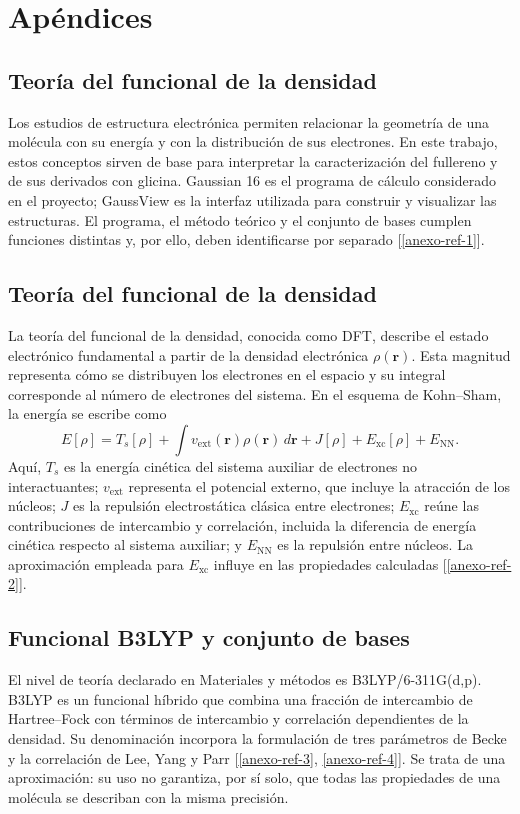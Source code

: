 
\chapter{Apéndices}
\label{ap:fundamentos-gaussian}
\section{Teoría del funcional de la densidad}
Los estudios de estructura electrónica permiten relacionar la geometría de una molécula con su energía y con la distribución de sus electrones. En este trabajo, estos conceptos sirven de base para interpretar la caracterización del fullereno y de sus derivados con glicina. Gaussian 16 es el programa de cálculo considerado en el proyecto; GaussView es la interfaz utilizada para construir y visualizar las estructuras. El programa, el método teórico y el conjunto de bases cumplen funciones distintas y, por ello, deben identificarse por separado [\ref{anexo-ref-1}].

\section{Teoría del funcional de la densidad}
La teoría del funcional de la densidad, conocida como DFT, describe el estado electrónico fundamental a partir de la densidad electrónica $\rho(\mathbf r)$. Esta magnitud representa cómo se distribuyen los electrones en el espacio y su integral corresponde al número de electrones del sistema. En el esquema de Kohn--Sham, la energía se escribe como
\begin{equation}
 E[\rho]=T_s[\rho]+\int v_{\mathrm{ext}}(\mathbf r)\rho(\mathbf r)\,d\mathbf r
 +J[\rho]+E_{\mathrm{xc}}[\rho]+E_{\mathrm{NN}}.
\end{equation}
Aquí, $T_s$ es la energía cinética del sistema auxiliar de electrones no interactuantes; $v_{\mathrm{ext}}$ representa el potencial externo, que incluye la atracción de los núcleos; $J$ es la repulsión electrostática clásica entre electrones; $E_{\mathrm{xc}}$ reúne las contribuciones de intercambio y correlación, incluida la diferencia de energía cinética respecto al sistema auxiliar; y $E_{\mathrm{NN}}$ es la repulsión entre núcleos. La aproximación empleada para $E_{\mathrm{xc}}$ influye en las propiedades calculadas [\ref{anexo-ref-2}].

\section{Funcional B3LYP y conjunto de bases}
El nivel de teoría declarado en Materiales y métodos es B3LYP/6-311G(d,p). B3LYP es un funcional híbrido que combina una fracción de intercambio de Hartree--Fock con términos de intercambio y correlación dependientes de la densidad. Su denominación incorpora la formulación de tres parámetros de Becke y la correlación de Lee, Yang y Parr [\ref{anexo-ref-3}, \ref{anexo-ref-4}]. Se trata de una aproximación: su uso no garantiza, por sí solo, que todas las propiedades de una molécula se describan con la misma precisión.

